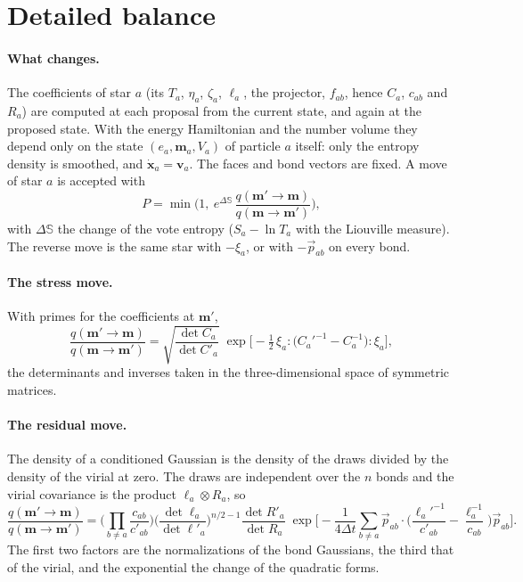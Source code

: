 \documentclass[11pt,aps,preprint,nofootinbib,superscriptaddress,tightenlines]{revtex4-2}
\def\st{\begin{equation}}
\def\stp{\end{equation}}
\let\oldparagraph\paragraph
\renewcommand{\paragraph}{\par\bigskip\oldparagraph}
\begin{document}
\section{Detailed balance}
\label{sec:hastings}

\paragraph{What changes.}  The coefficients of star $a$ (its $T_a$, $\eta_a$, $\zeta_a$, $\ell_a$, the projector, $f_{ab}$, hence $C_a$, $c_{ab}$ and
$R_a$) are computed at each proposal from the current state, and again at the proposed state.  With the energy Hamiltonian and the
number volume they depend only on the state $(e_a,\bm m_a,V_a)$ of particle $a$ itself: only the entropy density is smoothed, and $\dot{\bm x}_a=\bm v_a$.
The faces and bond vectors are fixed.  A move of star $a$ is accepted with
\st
P=\min\Big(1,\ e^{\Delta\mathbb S}\,\frac{q(\bm m'\to\bm m)}{q(\bm m\to\bm m')}\Big) ,
\label{hastings}
\stp
with $\Delta\mathbb S$ the change of the vote entropy ($S_a-\ln T_a$ with the Liouville measure).  The reverse move is the same star with
$-\xi_a$, or with $-\vec p_{ab}$ on every bond.

\paragraph{The stress move.}  With primes for the coefficients at $\bm m'$,
\st
\frac{q(\bm m'\to\bm m)}{q(\bm m\to\bm m')}=\sqrt{\frac{\det C_a}{\det C'_a}}\;
\exp\Big[-\tfrac12\,\xi_a{:}\big(C_a'^{-1}-C_a^{-1}\big){:}\xi_a\Big] ,
\label{qstress}
\stp
the determinants and inverses taken in the three-dimensional space of symmetric matrices.

\paragraph{The residual move.}  The density of a conditioned Gaussian is the density of the draws divided by the density of the virial at
zero.  The draws are independent over the $n$ bonds and the virial covariance is the product $\ell_a\otimes R_a$, so
\st
\frac{q(\bm m'\to\bm m)}{q(\bm m\to\bm m')}
=\Big(\prod_{b\neq a}\frac{c_{ab}}{c'_{ab}}\Big)\Big(\frac{\det\ell_a}{\det\ell'_a}\Big)^{n/2-1}\frac{\det R'_a}{\det R_a}\;
\exp\Big[-\frac{1}{4\Delta t}\sum_{b\neq a}\vec p_{ab}\cdot\Big(\frac{\ell_a'^{-1}}{c'_{ab}}-\frac{\ell_a^{-1}}{c_{ab}}\Big)\vec p_{ab}\Big] .
\label{qresid}
\stp
The first two factors are the normalizations of the bond Gaussians, the third that of the virial, and the exponential the change of the
quadratic forms.
\end{document}

